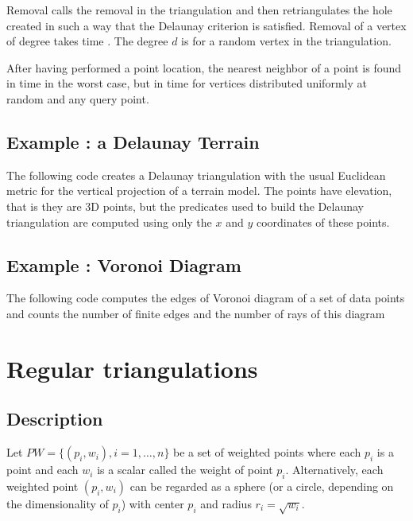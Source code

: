 Removal calls the removal in the triangulation and then retriangulates
the hole created in such a way that  the Delaunay criterion is
satisfied. Removal of a
vertex of degree  takes time .
The degree $d$ is  for a random
vertex in the triangulation.

After having performed a  point location, the
nearest neighbor of a point is found in time  in the
worst case, but in time 
for vertices distributed uniformly at random  and any query point. 


\subsection{Example : a Delaunay Terrain}
\label{Subsection_2D_Triangulations_Delaunay_Terrain}

The following code  creates a Delaunay triangulation with 
the usual Euclidean metric for the vertical projection of a 
terrain model. The points have elevation, that is they are 3D points,
but the predicates used to build the  Delaunay triangulation
are computed using only  the $x$ and $y$ coordinates  
of these points. 

\subsection{Example : Voronoi Diagram}
\label{Subsection_2D_Triangulations_Voronoi}
The following code computes the edges of Voronoi diagram
of a set of data points
and counts  the number of finite edges and the number of rays
of this diagram


\section{Regular triangulations}
\label{Section_2D_Triangulations_Regular}

\subsection{Description}
\label{Subsection_2D_Triangulations_Regular_Description}
Let ${  PW} = \{(p_i, w_i), i = 1, \ldots , n \}$ be a set of 
weighted points where each $p_i$ is a point and each $w_i$
is a scalar called the weight of point $p_i$.
Alternatively, each weighted point $(p_i, w_i)$ can be regarded
as a sphere (or a circle, depending on the dimensionality
of $p_i$)  with center $p_i$ and radius $r_i=\sqrt{w_i}$.

